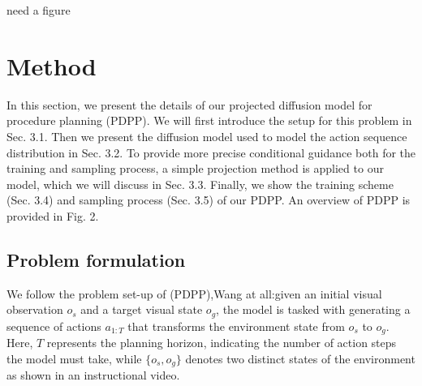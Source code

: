 \documentclass{article} %
\begin{document}
need a figure
\section{Method}
In this section, we present the details of our projected diffusion model for procedure planning (PDPP). We will first introduce the setup for this problem in Sec. 3.1. Then we present the diffusion model used to model the action sequence distribution in Sec. 3.2. To provide more precise conditional guidance both for the training and sampling process, a simple projection method is applied to our model, which we will discuss in Sec. 3.3. Finally, we show the training scheme (Sec. 3.4) and sampling process (Sec. 3.5) of our PDPP. An overview of PDPP is provided in Fig. 2.
\subsection{Problem formulation}
We follow the problem set-up of (PDPP),Wang at all:given an initial visual observation \(o_s\) and a target visual state \(o_g\), the model is tasked with generating a sequence of actions \(a_{1:T}\) that transforms the environment state from \(o_s\) to \(o_g\). Here, \(T\) represents the planning horizon, indicating the number of action steps the model must take, while \(\{o_s, o_g\}\) denotes two distinct states of the environment as shown in an instructional video.
\end{document}
